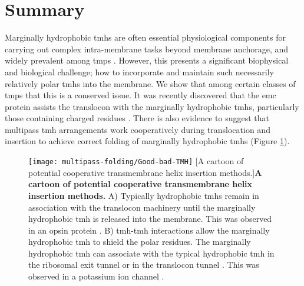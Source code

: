 \section{Summary}

Marginally hydrophobic \gls{tmh}s are often essential physiological components for carrying out complex intra-membrane tasks beyond membrane anchorage, and widely prevalent among \gls{tmp}s \cite{Hessa2007}.
However, this presents a significant biophysical and biological challenge; how to incorporate and maintain such necessarily relatively polar \gls{tmh}s into the membrane.
We show that among certain classes of \gls{tmp}s that this is a conserved issue.
It was recently discovered that the \gls{emc} protein assists the translocon with the marginally hydrophobic \gls{tmh}s, particularly those containing charged residues  \cite{Shurtleff2018}.
There is also evidence to suggest that multipass \gls{tmh} arrangements work cooperatively during translocation and insertion to achieve correct folding of marginally hydrophobic \gls{tmh}s \cite{Ismail2008, Virkki2014, Sadlish2005, Cross2009, Cymer2013, Sato2002, Sato2003, Zhang2007, Cymer2015, Tu2000, Tu2014, Ojemalm2012} (Figure \ref{fig:Good-bad-TMH}).

\begin{figure}[!ht]
\centering
\texttt{[image: multipass-folding/Good-bad-TMH]}
		[A cartoon of potential cooperative transmembrane helix insertion methods.]{\textbf{A cartoon of potential cooperative transmembrane helix insertion methods.}
    A) Typically hydrophobic \gls{tmh}s remain in association with the translocon machinery until the marginally hydrophobic \gls{tmh} is released into the membrane.
    This was observed in an opsin protein \cite{Ismail2008}.
    B) \gls{tmh}\--\gls{tmh} interactions allow the marginally hydrophobic \gls{tmh} to shield the polar residues.
    The marginally hydrophobic \gls{tmh} can associate with the typical hydrophobic \gls{tmh} in the ribosomal exit tunnel \cite{Tu2014} or in the translocon tunnel \cite{Zhang2007}.
    This was observed in a potassium ion channel \cite{Tu2014, Zhang2007, Cymer2015}.
    }

\label{fig:Good-bad-TMH}
\end{figure}

